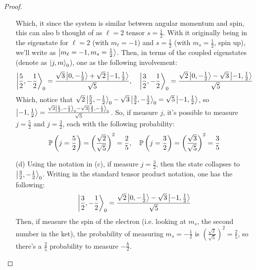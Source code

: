 \documentclass{article}
\begin{document}
\begin{proof}
\begin{itemize}
        Which, it since the system is similar between angular momentum and spin, this can also b thought of as $\ell=2$ tensor $s=\frac{1}{2}$. With it originally being in the eigenstate for $\ell=2$ (with $m_\ell=-1$) and $s=\frac{1}{2}$ (with $m_s = \frac{1}{2}$, spin up),  we'll write as $\ket{m_\ell = -1, m_s = \frac{1}{2}}$. Then, in terms of the coupled eigenstates (denote as $\ket{j,m}_0$), one as the following involvement:
        \begin{align}
            \ket{\frac{5}{2},-\frac{1}{2}}_0 = \frac{\sqrt{3}\ket{0,-\frac{1}{2}}+\sqrt{2}\ket{-1,\frac{1}{2}}}{\sqrt{5}},\quad \ket{\frac{3}{2},-\frac{1}{2}}_0 = \frac{\sqrt{2}\ket{0,-\frac{1}{2}}-\sqrt{3}\ket{-1,\frac{1}{2}}}{\sqrt{5}}
        \end{align}
        Which, notice that $\sqrt{2}\ket{\frac{5}{2},-\frac{1}{2}}_0 - \sqrt{3}\ket{\frac{3}{2},-\frac{1}{2}}_0 = \sqrt{5}\ket{-1,\frac{1}{2}}$, so $\ket{-1,\frac{1}{2}}=\frac{\sqrt{2}\ket{\frac{5}{2},-\frac{1}{2}}_0-\sqrt{3}\ket{\frac{3}{2},-\frac{1}{2}}_0}{\sqrt{5}}$. So, if measure $j$, it's possible to measure $j=\frac{5}{2}$ and $j=\frac{3}{2}$, each with the following probability:
        \begin{align}
            \PP\left(j=\frac{5}{2}\right) = \left(\frac{\sqrt{2}}{\sqrt{5}}\right)^2 = \frac{2}{5},\quad \PP\left(j=\frac{3}{2}\right) = \left(\frac{\sqrt{3}}{\sqrt{5}}\right)^2 = \frac{3}{5}
        \end{align}
        
        \hfil

        \item[(d)] Using the notation in (c), if measure $j=\frac{3}{2}$, then the state collapses to $\ket{\frac{3}{2},-\frac{1}{2}}_0$. Writing in the standard tensor product notation, one has the following:
        \begin{align}
            \ket{\frac{3}{2},-\frac{1}{2}}_0 = \frac{\sqrt{2}\ket{0,-\frac{1}{2}}-\sqrt{3}\ket{-1,\frac{1}{2}}}{\sqrt{5}}
        \end{align}
        Then, if measure the spin of the electron (i.e. looking at $m_s$, the second number in the ket), the probability of measuring $m_s = -\frac{1}{2}$ is $\left(\frac{\sqrt{2}}{\sqrt{5}}\right)^2 =\frac{2}{5}$, so there's a $\frac{2}{5}$ probability to measure $-\frac{\hbar}{2}$.
    \end{itemize}
\end{proof}

\newpage
\end{document}
